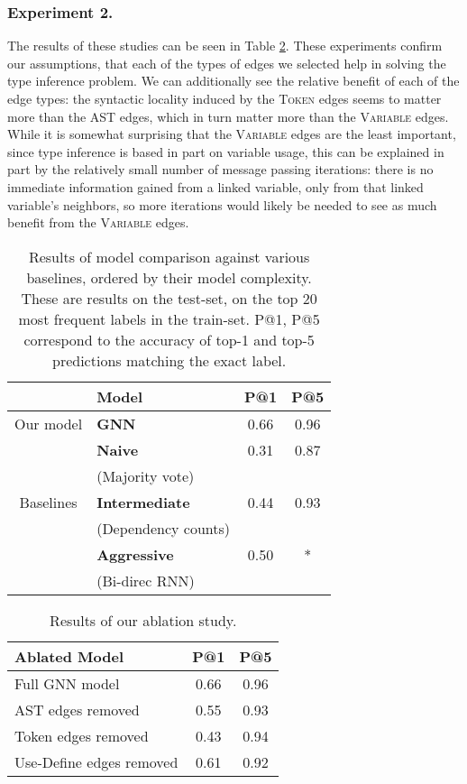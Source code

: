 \subsubsection{Experiment 2.} The results of these studies can be seen in Table \ref{tab:results:ablations}.
These experiments confirm our assumptions, that each of the types of edges we selected help in solving the type inference problem.
We can additionally see the relative benefit of each of the edge types: the syntactic locality induced by the \textsc{Token} edges seems to matter more than the AST edges, which in turn matter more than the \textsc{Variable} edges.
While it is somewhat surprising that the \textsc{Variable} edges are the least important, since type inference is based in part on variable usage, this can be explained in part by the relatively small number of message passing iterations: there is no immediate information gained from a linked variable, only from that linked variable's neighbors, so more iterations would likely be needed to see as much benefit from the \textsc{Variable} edges.

\begin{table}
 \centering
 {\renewcommand{\arraystretch}{1.3}%
 \begin{tabular}{c|lcc}
 	 ~ & \textbf{Model} & \textbf{P@1} & \textbf{P@5} \\
 	\hline
 	Our model & \textbf{GNN} & 0.66 & 0.96 \\
 	\hline
 	 ~ & \textbf{Naive} & 0.31 & 0.87 \\
 	 ~	 & (Majority vote) & ~ & ~ \\
	\cline{2-4}
	 Baselines & \textbf{Intermediate} & 0.44 & 0.93 \\
 	 ~	 & (Dependency counts) & ~ & ~ \\
 	\cline{2-4}
	 ~	 & \textbf{Aggressive} & 0.50 & * \\
 	 ~	 & (Bi-direc RNN) & ~ & ~ \\
 \end{tabular}
}
 \caption{Results of model comparison against various baselines, ordered by their model complexity. These are results on the test-set, on the top 20 most frequent labels in the train-set. P@1, P@5 correspond to the accuracy of top-1 and top-5 predictions matching the exact label.}
 \label{tab:results:baselines}
\end{table}

\begin{table}
	\centering
	 {\renewcommand{\arraystretch}{1.3}%
	 	\begin{tabular}{l|cc}
	 		\textbf{Ablated Model} & \textbf{P@1} & \textbf{P@5} \\
	 		\hline
	 		Full GNN model & 0.66 & 0.96 \\
	 		AST edges removed &  0.55 & 0.93 \\
			Token edges removed & 0.43 & 0.94 \\
			Use-Define edges removed & 0.61 & 0.92 \\
	 	\end{tabular}
	 }
	  \caption{Results of our ablation study.}
	  \label{tab:results:ablations}
\end{table}


